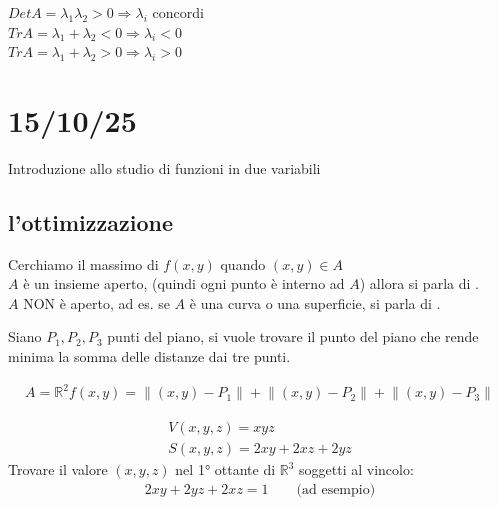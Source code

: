 \documentclass[a4paper, oneside]{article}
\begin{document}
        \begin{proposition}
            $Det A = \lambda_1 \lambda_2 > 0 \Rightarrow \lambda_i$ concordi\\
            $Tr A = \lambda_1 + \lambda_2 < 0 \Rightarrow \lambda_i< 0$\\
            $Tr A = \lambda_1 + \lambda_2 > 0 \Rightarrow \lambda_i> 0$\\ 
        \end{proposition}
        \newpage
        \section{15/10/25}
        Introduzione allo studio di funzioni in due variabili
        \subsection{l'ottimizzazione}
        Cerchiamo il massimo di $f(x,y)$ quando $(x,y) \in A$\\
         $A$ è un insieme aperto, (quindi ogni punto è interno ad $A$) allora si parla di .\\
         $A$ NON è aperto, ad es. se $A$ è una curva o una superficie, si parla di .\\
        \begin{example}
            Siano $P_1,P_2,P_3$ punti del piano, si vuole trovare il punto del piano che rende minima la somma delle distanze dai tre punti.
\begin{center}
                
\end{center}
            \begin{gather*}
                A = \mathbb{R}^2
                f(x,y) = \left\lVert (x,y) -P_1 \right\rVert + \left\lVert (x,y) -P_2 \right\rVert + \left\lVert (x,y) -P_3 \right\rVert 
            \end{gather*}

            \begin{gather*}
                V(x,y,z) = xyz\\
                S(x,y,z) = 2xy+2xz+2yz
            \end{gather*}
            Trovare il valore $(x,y,z)$ nel 1° ottante di $\mathbb{R}^3$ soggetti al vincolo:
            \begin{gather*}
                2xy +2yz +2xz = 1 \qquad \text{(ad esempio)}
            \end{gather*}
        \end{example}
\end{document}

